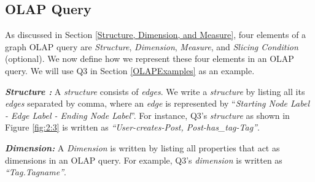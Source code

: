 %
%
%
%
%
%
%

\subsection{OLAP Query}

As discussed in Section \ref{Structure, Dimension, and Measure}, four elements of a graph OLAP query are \textit{Structure}, \textit{Dimension}, \textit{Measure}, and \textit{Slicing Condition} (optional). We now define how we represent these four elements in an OLAP query. We will use Q3 in Section \ref{OLAPExamples} as an example.

\noindent\textbf{\textit{Structure :}} A \textit{structure} consists of \textit{edges}. We write a \textit{structure} by listing all its \textit{edges} separated by comma, where an \textit{edge} is represented by ``\textit{Starting Node Label - Edge Label - Ending Node Label}''. For instance, Q3's \textit{structure} as shown in Figure \ref{fig:2:3} is written as \textit{``User-creates-Post, Post-has\_tag-Tag''}.



\noindent\textbf{\textit{Dimension:}} A
\textit{Dimension} is written by listing all properties that act as dimensions in an OLAP query. For example, Q3's \textit{dimension} is written as \textit{``Tag.Tagname''}.

